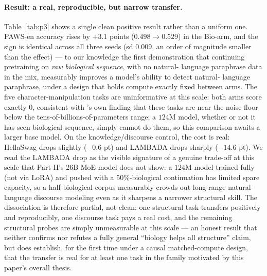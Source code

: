 \paragraph{Result: a real, reproducible, but narrow transfer.} Table~\ref{tab:p3} shows a single
clean positive result rather than a uniform one. PAWS-en accuracy rises by $+3.1$ points
($0.498\!\to\!0.529$) in the Bio-arm, and the sign is identical across all three seeds
(sd $0.009$, an order of magnitude smaller than the effect) --- to our knowledge the first
demonstration that continuing pretraining on \emph{raw biological sequence}, with no natural-
language paraphrase data in the mix, measurably improves a model's ability to detect natural-
language paraphrase, under a design that holds compute exactly fixed between arms. The five
character-manipulation tasks are uninformative at this scale: both arms score exactly $0$,
consistent with \citet{brown2020gpt3}'s own finding that these tasks are near the noise floor
below the tens-of-billions-of-parameters range; a $124$M model, whether or not it has seen
biological sequence, simply cannot do them, so this comparison awaits a larger base model. On the
knowledge/discourse control, the cost is real: HellaSwag drops slightly ($-0.6$ pt) and LAMBADA
drops sharply ($-14.6$ pt). We read the LAMBADA drop as the visible signature of a genuine
trade-off at this scale that Part II's 26B MoE model does not show: a $124$M model trained fully
(not via LoRA) and pushed with a $50\%$-biological continuation has limited spare capacity, so a
half-biological corpus measurably crowds out long-range natural-language discourse modeling even
as it sharpens a narrower structural skill. The dissociation is therefore partial, not clean: one
structural task transfers positively and reproducibly, one discourse task pays a real cost, and
the remaining structural probes are simply unmeasurable at this scale --- an honest result that
neither confirms nor refutes a fully general ``biology helps all structure'' claim, but does
establish, for the first time under a causal matched-compute design, that the transfer is real
for at least one task in the family motivated by this paper's overall thesis.
